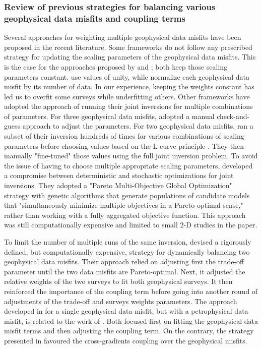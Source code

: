 \documentclass[extra, mreferee]{gji_joint} %
\begin{document}
\subsubsection{Review of previous strategies for balancing various geophysical data misfits and coupling terms}

Several approaches for weighting multiple geophysical data misfits have been proposed in the recent literature. Some frameworks do not follow any prescribed strategy for updating the scaling parameters of the geophysical data misfits. This is the case for the approaches proposed by \citet{Sun2016, Sun2017} and \citet{Sosa}; both keep those scaling parameters constant. \citeauthor{Sun2017} use values of unity, while \citeauthor{Sosa} normalize each geophysical data misfit by its number of data. In our experience, keeping the weights constant has led us to overfit some surveys while underfitting others. Other frameworks have adopted the approach of running their joint inversions for multiple combinations of parameters. For three geophysical data misfits, \citet{Moorkamp2011} adopted a manual check-and-guess approach to adjust the parameters. For two geophysical data misfits, \citet{Giraud2019} ran a subset of their inversion hundreds of times for various combinations of scaling parameters before choosing values based on the L-curve principle \citep{HansenLcurve0, Hansenlcurve, SantosLcurve}. They then manually "fine-tuned" those values using the full joint inversion problem. To avoid the issue of having to choose multiple appropriate scaling parameters, \citet{Bijani2017} developed a compromise between deterministic and stochastic optimizations for joint inversions. They adopted a "Pareto Multi-Objective Global Optimization" strategy with genetic algorithms that generate populations of candidate models that "simultaneously minimize multiple objectives in a Pareto-optimal sense," rather than working with a fully aggregated objective function. This approach was still computationally expensive and limited to small 2-D studies in the paper.

To limit the number of multiple runs of the same inversion, \citet{Lelievre2012} devised a rigorously defined, but computationally expensive, strategy for dynamically balancing two geophysical data misfits. Their approach relied on adjusting first the trade-off parameter until the two data misfits are Pareto-optimal. Next, it adjusted the relative weights of the two surveys to fit both geophysical surveys. It then reinforced the importance of the coupling term before going into another round of adjustments of the trade-off and surveys weights parameters. The approach developed in \citet{ggz389} for a single geophysical data misfit, but with a petrophysical data misfit, is related to the work of \citet{Lelievre2012}. Both focused first on fitting the geophysical data misfit terms and then adjusting the coupling term. On the contrary, the strategy presented in \citet{gallardo_strategy} favoured the cross-gradients coupling over the geophysical misfits.
\end{document}
